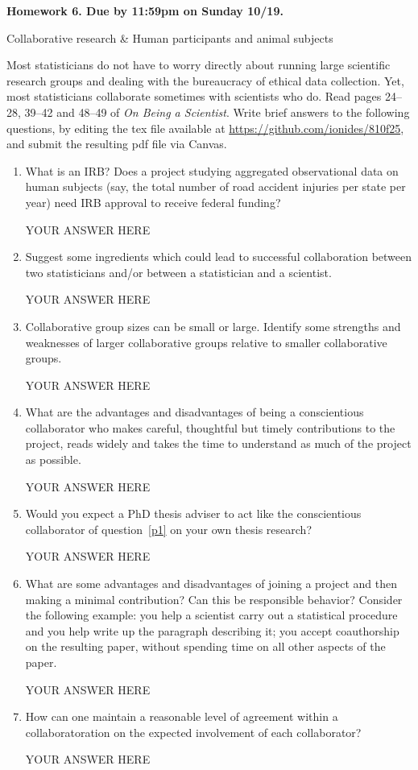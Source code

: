 \documentclass[12pt]{article}
\begin{document}
\begin{center}\bf
Homework 6. Due by 11:59pm on Sunday 10/19.

Collaborative research \& Human participants and animal subjects

\end{center}
Most statisticians do not have to worry directly about running large scientific research groups and dealing with the bureaucracy of ethical data collection. Yet, most statisticians collaborate sometimes with scientists who do. Read pages 24--28, 39--42 and 48--49 of {\em On Being a Scientist}.  Write brief answers to the following questions, by editing the tex file available at \url{https://github.com/ionides/810f25}, and submit the resulting pdf file via Canvas.

\begin{enumerate}

\item What is an IRB? Does a project studying aggregated observational data on human subjects (say, the total number of road accident injuries per state per year) need IRB approval to receive federal funding?

YOUR ANSWER HERE

\item Suggest some ingredients which could lead to successful collaboration between two statisticians and/or between a statistician and a scientist.

YOUR ANSWER HERE

\item Collaborative group sizes can be small or large. Identify some strengths and weaknesses of larger collaborative groups relative to smaller collaborative groups.

YOUR ANSWER HERE
 
\item \label{p1} What are the advantages and disadvantages of being a conscientious collaborator who makes careful, thoughtful but timely contributions to the project, reads widely and takes the time to understand as much of the project as possible.

YOUR ANSWER HERE

\item Would you expect a PhD thesis adviser to act like the conscientious collaborator of question~\ref{p1} on your own thesis research? 

YOUR ANSWER HERE

\item What are some advantages and disadvantages of joining a project and then making a minimal contribution? Can this be responsible behavior? Consider the following example: you help a scientist carry out a statistical procedure and you help write up the paragraph describing it; you accept coauthorship on the resulting paper, without spending time on all other aspects of the paper.

YOUR ANSWER HERE

\item How can one maintain a reasonable level of agreement within a collaboratoration on the expected involvement of each collaborator?

YOUR ANSWER HERE

\end{enumerate}
\end{document}
